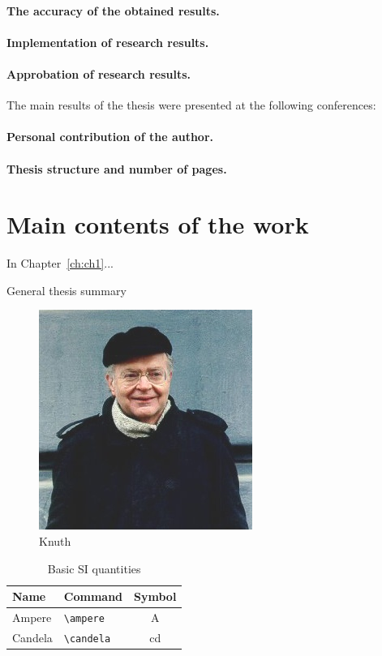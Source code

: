 \paragraph*{The accuracy of the obtained results.}

\paragraph*{Implementation of research results.}
\paragraph*{Approbation of research results.}
The main results of the thesis were presented at the following conferences:
\printConferenceEN
\paragraph*{Personal contribution of the author.}
\paragraph*{Thesis structure and number of pages.}

\newpage
\section*{Main contents of the work}

In Chapter~\ref{ch:ch1}...
\begin{center}
	General thesis summary
\end{center}
\begin{figure}
	\centering
	\includegraphics[width=0.4\linewidth]{images/knuth}
	\caption{Knuth}
\end{figure}
\begin{table}
	\centering
	\captionsetup{justification=centering} %
	\caption{Basic SI quantities}%
	\begin{tabular}{llc}
		\toprule
		Name 	& 	Command 	& 	Symbol         \\
		\midrule
		Ampere     & \verb|\ampere| & \si{\ampere}   \\
		Candela   & \verb|\candela| & \si{\candela}  \\
		\bottomrule
	\end{tabular}
\end{table}

